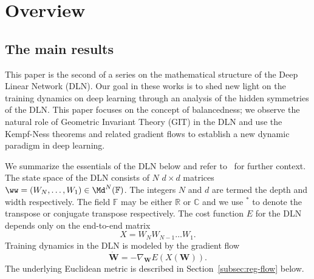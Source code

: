 \section{Overview}
\subsection{The main results}
This paper is the second of a series on the mathematical structure of the Deep Linear Network (DLN). Our goal in these works is to shed new light on the training dynamics on deep learning through an analysis of the hidden symmetries of the DLN. This paper focuses on the concept of balancedness; we observe the natural role of Geometric Invariant Theory (GIT) in the DLN and use the Kempf-Ness theorems and related gradient flows to establish a new dynamic paradigm in deep learning. 

We summarize the essentials of the DLN below and refer to~\cite{MY-dln} for further context. The state space of the DLN consists of $N$ $d\times d$ matrices $\ww=(W_N,\ldots,W_1)\in \Md^N(\mathbb{F})$. The integers $N$ and $d$ are termed the depth and width respectively. The field $\mathbb{F}$ may be either $\mathbb{R}$ or $\mathbb{C}$ and we use $^*$ to denote the transpose or conjugate transpose respectively. The cost function $E$ for the DLN depends only on the end-to-end matrix 
\begin{equation}
    \label{eq:balanced-intro1}
    X= W_N W_{N-1} \ldots W_1.
\end{equation}
Training dynamics in the DLN is modeled by the gradient flow 
\begin{equation}
    \label{eq:balanced-intro1a}
    \dot{\mathbf{W}} = - \nabla_\mathbf{W}E(X(\mathbf{W})).
\end{equation}
The underlying Euclidean metric is described in Section~\ref{subsec:reg-flow} below.


